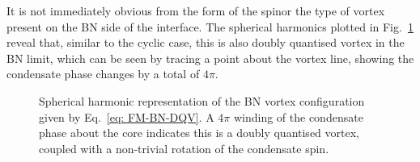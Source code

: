 It is not immediately obvious from the form of the spinor the type of vortex
present on the BN side of the interface.
The spherical harmonics plotted in Fig.~\ref{fig: BN-DQV} reveal that, similar
to the cyclic case, this is also doubly quantised vortex in the BN limit, which
can be seen by tracing a point about the vortex line, showing the condensate
phase changes by a total of \(4\pi \).
\begin{figure}
    \centering
    \caption[Spherical harmonic representation of a biaxial nematic doubly
        quantised vortex]
    {\label{fig: BN-DQV} Spherical harmonic
        representation of the BN vortex configuration given by
        Eq.~\eqref{eq: FM-BN-DQV}.
        A \(4\pi \) winding of the condensate phase about the core indicates
        this is a doubly quantised vortex, coupled with a non-trivial rotation
        of the condensate spin.}
\end{figure}

